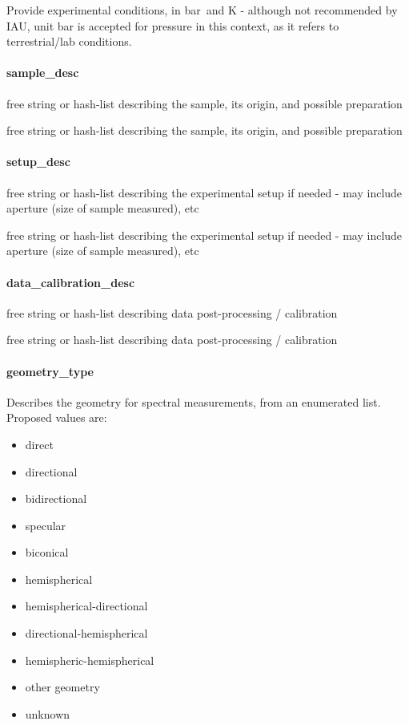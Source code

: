 \documentclass[11pt,a4paper]{ivoa}
\begin{document}
Provide experimental conditions, in bar and K - although not recommended by IAU, unit bar is accepted for pressure in this context, as it refers to terrestrial/lab conditions.

\paragraph{sample\_desc}

free string or hash-list describing the sample, its origin, and possible preparation

free string or hash-list describing the sample, its origin, and possible preparation

\paragraph{setup\_desc}

free string or hash-list describing the experimental setup if needed - may include aperture (size of sample measured), etc

free string or hash-list describing the experimental setup if needed - may include aperture (size of sample measured), etc

\paragraph{data\_calibration\_desc}

free string or hash-list describing data post-processing / calibration

free string or hash-list describing data post-processing / calibration

\paragraph{geometry\_type}

Describes the geometry for spectral measurements, from an enumerated list. Proposed values are:

\begin{itemize}
\item direct
\item directional
\item bidirectional
\item specular
\item biconical
\item hemispherical
\item hemispherical-directional
\item directional-hemispherical
\item hemispheric-hemispherical
\item other geometry
\item unknown
\end{itemize}
\end{document}
